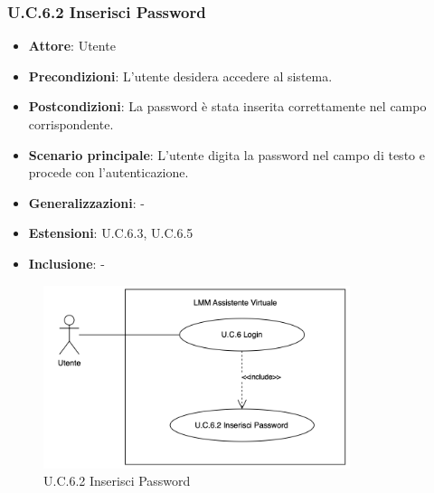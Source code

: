 \subsubsection{U.C.6.2 Inserisci Password}
\begin{itemize}
    \item \textbf{Attore}: Utente
    \item \textbf{Precondizioni}: L'utente desidera accedere al sistema.
    \item \textbf{Postcondizioni}: La password è stata inserita correttamente nel campo corrispondente.
    \item \textbf{Scenario principale}: L'utente digita la password nel campo di testo e procede con l'autenticazione.
    \item \textbf{Generalizzazioni}: -
    \item \textbf{Estensioni}: U.C.6.3, U.C.6.5
    \item \textbf{Inclusione}: -
\end{itemize}
\begin{figure}[H]
    \centering
    \includegraphics[width=0.8\textwidth]{img/UC6.2.png}
    \caption{U.C.6.2 Inserisci Password}
\end{figure}
\newpage

